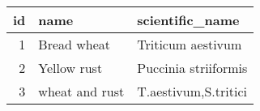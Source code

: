 \begin{tabular}{rll}
\toprule
   id & name                          & scientific\_name                                         \\
\midrule
    1 & Bread wheat                 & Triticum aestivum                                     \\
    2 & Yellow rust                 & Puccinia striiformis              \\
    3 & wheat and rust & T.aestivum,S.tritici  \\
\bottomrule
\end{tabular}
